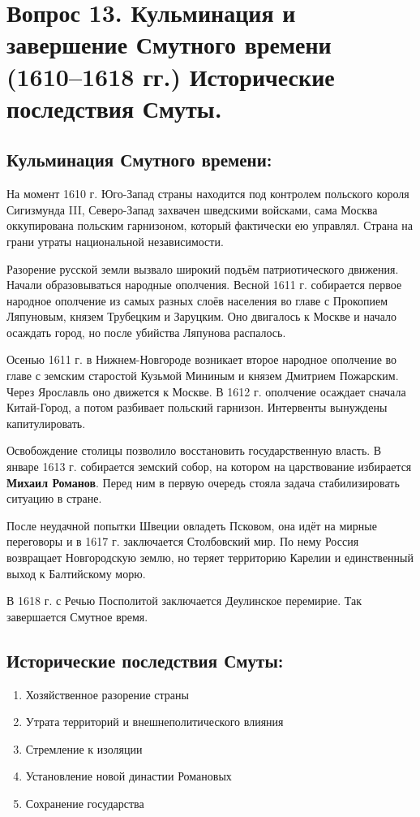 \section{Вопрос 13. Кульминация и завершение Смутного времени (1610--1618 гг.) Исторические последствия Смуты.}

\subsection{Кульминация Смутного времени:}

На момент 1610 г. Юго-Запад страны находится под контролем польского короля Сигизмунда III, Северо-Запад захвачен шведскими войсками, сама Москва оккупирована польским гарнизоном, который фактически ею управлял. Страна на грани утраты национальной независимости.

Разорение русской земли вызвало широкий подъём патриотического движения. Начали образовываться народные ополчения. Весной 1611 г. собирается первое народное ополчение из самых разных слоёв населения во главе с Прокопием Ляпуновым, князем Трубецким и Заруцким. Оно двигалось к Москве и начало осаждать город, но после убийства Ляпунова распалось.

Осенью 1611 г. в Нижнем-Новгороде возникает второе народное ополчение во главе с земским старостой Кузьмой Мининым и князем Дмитрием Пожарским. Через Ярославль оно движется к Москве. В 1612 г. ополчение осаждает сначала Китай-Город, а потом разбивает польский гарнизон. Интервенты вынуждены капитулировать.

Освобождение столицы позволило восстановить государственную власть. В январе 1613 г. собирается земский собор, на котором на царствование избирается \textbf{Михаил Романов}. Перед ним в первую очередь стояла задача стабилизировать ситуацию в стране. 

После неудачной попытки Швеции овладеть Псковом, она идёт на мирные переговоры и в 1617 г. заключается Столбовский мир. По нему Россия возвращает Новгородскую землю, но теряет территорию Карелии и единственный выход к Балтийскому морю.

В 1618 г. с Речью Посполитой заключается Деулинское перемирие. Так завершается Смутное время.

\subsection{Исторические последствия Смуты:}

\begin{enumerate}
    \item{ Хозяйственное разорение страны }
    \item{ Утрата территорий и внешнеполитического влияния }
    \item{ Стремление к изоляции }
    \item{ Установление новой династии Романовых }
    \item{ Сохранение государства }
\end{enumerate}
